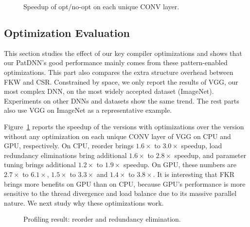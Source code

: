 \documentclass[sigplan,screen]{acmart}
\begin{document}
\begin{figure}[t]
    \centering
        \caption{Speedup of opt/no-opt on each unique CONV layer.}
    \label{fig:eva_reorder_rle_tuning_speedup}
\end{figure}




\subsection{Optimization Evaluation}








This section studies the effect of our key compiler optimizations
and shows that our PatDNN's good performance mainly comes from these pattern-enabled optimizations. 
This part also compares the extra structure overhead between FKW and CSR.
Constrained by space, we only report the results of 
VGG, our most complex DNN, on the most widely accepted dataset (ImageNet). Experiments on other DNNs and datasets show the same trend. The rest parts also use VGG on ImageNet as a representative example.



Figure~\ref{fig:eva_reorder_rle_tuning_speedup} reports the speedup of the versions with optimizations over the version without any optimization on each unique CONV layer of VGG on CPU and GPU, respectively.  
On CPU, reorder brings $1.6\times$ to $3.0\times$ speedup, load redundancy eliminations bring additional $1.6\times$ to $2.8\times$ speedup, and parameter tuning brings additional $1.2\times$ to $1.9\times$ speedup. On GPU, these numbers are $2.7\times$ to $6.1\times$, $1.5\times$ to $3.3\times$ and $1.4\times$ to $3.8\times$. It is interesting that FKR brings more benefits on GPU than on CPU, because GPU's performance is more sensitive to the thread divergence and load balance due to its massive parallel nature. We next study why these optimizations work.


\begin{figure}[t]
    \centering
        \caption{Profiling result: reorder and redundancy elimination.}
    \label{fig:eva_reorder_rle_detail}
\end{figure}
\end{document}
